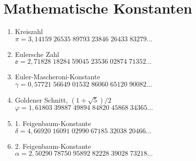 \section{Mathematische Konstanten}
\begin{enumerate}
\item Kreiszahl\\
$\pi = 3{,}14159\;26535\;89793\;23846\;26433\;83279\ldots$

\item Eulersche Zahl\\
$\ee = 2{,}71828\;18284\;59045\;23536\;02874\;71352\ldots$

\item Euler-Mascheroni-Konstante\\
$\gamma = 0{,}57721\;56649\;01532\;86060\;65120\;90082\ldots$

\item Goldener Schnitt, $(1+\sqrt{5})/2$\\
$\varphi = 1{,}61803\;39887\;49894\;84820\;45868\;34365\ldots$

\item 1. Feigenbaum-Konstante\\
$\delta = 4{,}66920\;16091\;02990\;67185\;32038\;20466\ldots$

\item 2. Feigenbaum-Konstante\\
$\alpha = 2{,}50290\;78750\;95892\;82228\;39028\;73218\ldots$
\end{enumerate}

\newpage
